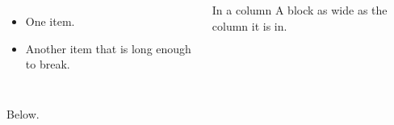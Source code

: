 \documentclass{beamer}
\begin{document}
\begin{frame}
\begin{columns}[t]
\begin{itemize}
\item One item.
\item Another item that is long enough to break.
\end{itemize}
\begin{block}{In a column}
A block as wide as the column it is in.
\end{block}
\end{columns}

Below.
\end{frame}
\end{document}
